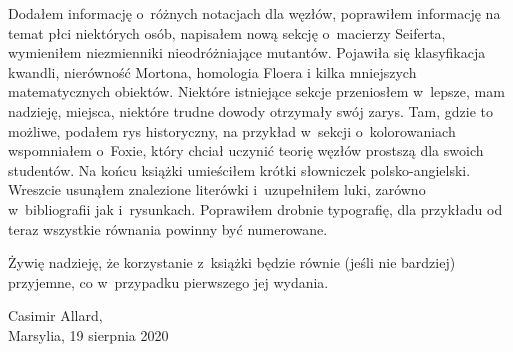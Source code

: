 Dodałem informację o~różnych notacjach dla węzłów, poprawiłem informację na temat płci niektórych osób, napisałem nową sekcję o~macierzy Seiferta, wymieniłem niezmienniki nieodróżniające mutantów.
Pojawiła się klasyfikacja kwandli, nierówność Mortona, homologia Floera i kilka mniejszych matematycznych obiektów.
%
Niektóre istniejące sekcje przeniosłem w~lepsze, mam nadzieję, miejsca, niektóre trudne dowody otrzymały swój zarys.
Tam, gdzie to możliwe, podałem rys historyczny, na przykład w~sekcji o~kolorowaniach wspomniałem o~Foxie, który chciał uczynić teorię węzłów prostszą dla swoich studentów.
Na końcu książki umieściłem krótki słowniczek polsko-angielski.
Wreszcie usunąłem znalezione literówki i~uzupełniłem luki, zarówno w~bibliografii jak i~rysunkach.
Poprawiłem drobnie typografię, dla przykładu od teraz wszystkie równania powinny być numerowane.

Żywię nadzieję, że korzystanie z~książki będzie równie (jeśli nie bardziej) przyjemne, co w~przypadku pierwszego jej wydania.

\begin{flushright}
Casimir Allard,\\Marsylia, 19 sierpnia 2020
\end{flushright}


